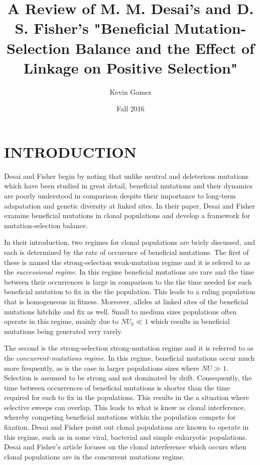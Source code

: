 \documentclass[12pt]{article}
\title{A Review of M. M. Desai's and D. S. Fisher's "Beneficial Mutation-Selection Balance and the Effect of Linkage on Positive Selection"}
\date{Fall 2016}
\author{Kevin Gomez}
\begin{document}
\maketitle
\newpage

\section*{INTRODUCTION}
Desai and Fisher \cite{DesFish07} begin by noting that unlike neutral and deleterious mutations which have been studied in great detail, beneficial mutations and their dynamics are poorly understood in comparison despite their importance to long-term adapatation and genetic diversity at linked sites.  In their paper, Desai and Fisher examine beneficial mutations in clonal populations and develop a framework for mutation-selection balance.  

In their introduction, two regimes for clonal populations are briely discussed, and each is determined by the rate of occurence of beneficial mutations.  The first of these is named the strong-selection weak-mutation regime and it is refered to as the \textit{successional regime}.  In this regime beneficial mutations are rare and the time between their occurrences is large in comparison to the the time needed for each beneficial mutation to fix in the the population.  This leads to a ruling population that is homogeneous in fitness. Moreover, alleles at linked sites of the beneficial mutations hitchike and fix as well.  Small to medium sizes populations often operate in this regime, mainly due to $NU_b \ll 1$ which results in beneficial mutations being generated very rarely. 

The second is the strong-selection strong-mutation regime and it is referred to as the \textit{concurrent-mutations regime}. In this regime, beneficial mutations occur much more frequently, as is the case in larger populations sizes where $NU \gg 1$.  Selection is assumed to be strong and not dominated by drift.  Consequently, the time between occurrences of beneficial mutations is shorter than the time required for each to fix in the populations.  This results in the a situation where selective sweeps can overlap. This leads to what is know as clonal interference, whereby competing beneficial mutations within the population compete for fixation. Desai and Fisher point out clonal populations are known to operate in this regime, such as in some viral, bacterial and simple eukaryotic populations.  Desai and Fisher's article focuses on the clonal interference which occurs when clonal populations are in the concurrent mutations regime.  
\end{document}
